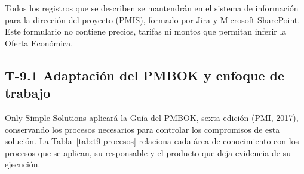 \documentclass[11pt]{article}
\begin{document}
Todos los registros que se describen se mantendrán en el sistema de información para la dirección del proyecto (PMIS), formado por Jira y Microsoft SharePoint. Este formulario no contiene precios, tarifas ni montos que permitan inferir la Oferta Económica.

\subsection{T-9.1 Adaptación del PMBOK y enfoque de trabajo}\label{t9-1}

Only Simple Solutions aplicará la Guía del PMBOK, sexta edición (PMI, 2017), conservando los procesos necesarios para controlar los compromisos de esta solución. La Tabla~\mbox{\ref{tab:t9-procesos}} relaciona cada área de conocimiento con los procesos que se aplican, su responsable y el producto que deja evidencia de su ejecución.
\end{document}
